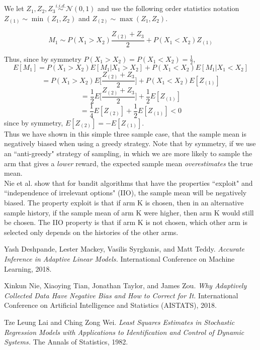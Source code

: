 \documentclass{article}
\newcommand{\iidsim}{\overset{i.i.d.}{\sim}}
\newcommand{\MC}{\mathcal}
\newcommand{\N}{\MC{N}}
\begin{document}
We let $Z_1, Z_2, Z_3 \iidsim \N(0,1)$ and use the following order statistics notation $Z_{(1)} \sim \min( Z_1, Z_2)$ and $Z_{(2)} \sim \max( Z_1, Z_2)$.

$$M_1 \sim P(X_1 > X_2) \frac{ Z_{(2)} + Z_3 }{2} + P(X_1 < X_2) Z_{(1)}$$

Thus, since by symmetry $P(X_1 > X_2) = P(X_1 < X_2) = \frac{1}{2}$,
$$E[ M_1 ] = P(X_1 > X_2) E[M_1 | X_1 > X_2] + P(X_1 < X_2) E[M_1 | X_1 < X_2]$$
$$= P(X_1 > X_2) E \bigg[ \frac{ Z_{(2)} + Z_3 }{2} \bigg] + P(X_1 < X_2) E[ Z_{(1)} ]$$
$$= \frac{1}{2} E \bigg[ \frac{ Z_{(2)} + Z_3 }{2} \bigg] + \frac{1}{2} E[ Z_{(1)} ]$$
$$= \frac{1}{4} E[ Z_{(2)} ] + \frac{1}{2} E[ Z_{(1)} ] < 0$$
since by symmetry, $E[Z_{(2)}] = -E[Z_{(1)}]$. \\

Thus we have shown in this simple three sample case, that the sample mean is negatively biased when using a greedy strategy.
Note that by symmetry, if we use an ``anti-greedy" strategy of sampling, in which we are more likely to sample the arm that gives a \textit{lower} reward, the expected sample mean \textit{overestimates} the true mean. \\

Nie et al. \cite{nie2018} show that for bandit algorithms that have the properties ``exploit" and ``independence of irrelevant options" (IIO), the sample mean will be negatively biased.
The property exploit is that if arm K is chosen, then in an alternative sample history, if the sample mean of arm K were higher, then arm K would still be chosen.
The IIO property is that if arm K is not chosen, which other arm is selected only depends on the histories of the other arms.

\begin{thebibliography}{9}

Yash Deshpande, Lester Mackey, Vasilis Syrgkanis, and Matt Teddy.
\textit{Accurate Inference in Adaptive Linear Models.}
International Conference on Machine Learning, 2018.

Xinkun Nie, Xiaoying Tian, Jonathan Taylor, and James Zou.
\textit{Why Adaptively Collected Data Have Negative Bias and How to Correct for It.}
International Conference on Artificial Intelligence and Statistics (AISTATS), 2018.

Tze Leung Lai and Ching Zong Wei.
\textit{Least Squares Estimates in Stochastic Regression Models with Applications to Identification and Control of Dynamic Systems.}
The Annals of Statistics, 1982.

\end{thebibliography}
\end{document}
